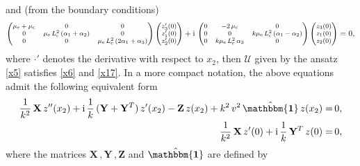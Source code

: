 \documentclass[10pt]{article}
\newcommand{\id}{{\mathbf{\mathbbm{1}}}}
\begin{document}
 and (from the boundary conditions)
 \begin{align}
 \begin{footnotesize}\begin{pmatrix} \mu_{\rm e} +\mu_{\rm c} &0	&0
 	\\
 	0& {\mu_{\rm e}\,L_{\rm c}^2}\,(\alpha_1+\alpha_2)   
 	&0
 	\\0
 	& 0 & {\mu_{\rm e}\,L_{\rm c}^2}\,(2\alpha_1+\alpha_3) \end{pmatrix}\end{footnotesize}\begin{footnotesize}\begin{pmatrix} 	z_3'(0)
 	\\
 	z_1'(0)
 	\\	z_2'(0)
 	\end{pmatrix}\end{footnotesize}+ {\rm i}\, \begin{footnotesize}\begin{pmatrix} 0& -2\,\mu_{\rm c} & 0  
 	\\
 	0 & 0 
 	& k{\mu_{\rm e}\,L_{\rm c}^2}\,(\alpha_1-\alpha_2)
 	\\0
 	& k{\mu_{\rm e}\,L_{\rm c}^2}\,\alpha_3 & 0  \end{pmatrix}\end{footnotesize}\begin{footnotesize}\begin{pmatrix}	z_3(0)
 	\\
 	z_1(0)
 	\\	z_2(0)
 \end{pmatrix}\end{footnotesize}=0,\notag
 \end{align}\normalsize
 where $\cdot '$ denotes the derivative with respect to $x_2$, then $\mathcal{U}$ given by the ansatz \eqref{x5} satisfies \eqref{x6} and \eqref{x17}.
In a more compact notation, the above equations admit the following equivalent form \begin{align}\label{11}
\frac{1}{k^2}\,{\mathbf{X}}\,z''(x_2)+ {\rm i}\,\frac{1}{k}\, ({\mathbf{Y}}+{\mathbf{Y}}^T)\,z'(x_2)-{\mathbf{Z}}\,z(x_2)+k^2\, v^2 \, \hat\id\,z(x_2)=&\,0,\\
\frac{1}{k^2}\,{\mathbf{X}}\,z'(0)+ {\rm i}\, \frac{1}{k}\,{\mathbf{Y}}^T\,z(0)=&\,0,\notag
\end{align} where
     the matrices  ${\mathbf{X}}\,,{\mathbf{Y}}\, , {\mathbf{Z}}$ and $\hat\id$  are defined by
\end{document}

